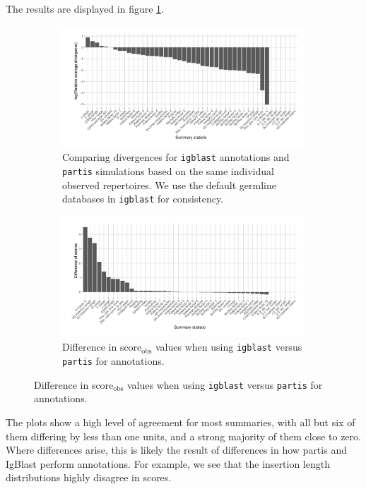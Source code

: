 \documentclass{article}
\begin{document}
The results are displayed in figure \ref{fig:IgBlastScores}.
\begin{figure}
	\begin{subfigure}{\textwidth}
   		\includegraphics[width=\linewidth]{Figures/PartisScores/obs_score_plot_igb.pdf}
    	\caption{Comparing divergences for \texttt{igblast} annotations and \texttt{partis} simulations based on the same individual observed repertoires.
    	    We use the default germline databases in \texttt{igblast} for consistency.
    	}
    	\label{fig:IgBlastScores}
	\end{subfigure}
	\begin{subfigure}{\textwidth}
   		\includegraphics[width=\linewidth]{Figures/PartisScores/score_diff.pdf}
    	\caption{Difference in score$_\text{obs}$ values when using \texttt{igblast} versus \texttt{partis} for annotations.
    	}
    	\label{fig:ScoreDiffs}
	\end{subfigure}
\end{figure}
The plots show a high level of agreement for most summaries, with all but six of them differing by less than one units, and a strong majority of them close to zero.
Where differences arise, this is likely the result of differences in how partis and IgBlast perform annotations.
For example, we see that the insertion length distributions highly disagree in scores.
\end{document}
